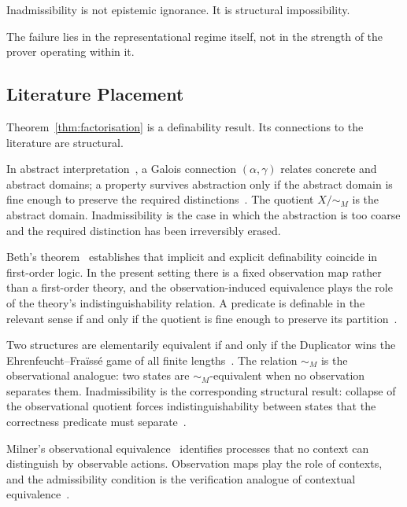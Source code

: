 \documentclass[12pt]{article}
\theoremstyle{plain}
\theoremstyle{definition}
\theoremstyle{remark}
\begin{document}
Inadmissibility is not epistemic ignorance.
It is structural impossibility.

The failure lies in the representational regime itself, not in the
strength of the prover operating within it.

\subsection{Literature Placement}
\label{subsec:literature}

Theorem~\ref{thm:factorisation} is a definability result.
Its connections to the literature are structural.

In abstract interpretation~\cite{cousot1977,cousot1979}, a Galois
connection $(\alpha,\gamma)$ relates concrete and abstract domains;
a property survives abstraction only if the abstract domain is fine
enough to preserve the required distinctions~\cite{cousot2002,giacobazzi1998}.
The quotient $X/{\sim_M}$ is the abstract domain.
Inadmissibility is the case in which the abstraction is too coarse
and the required distinction has been irreversibly erased.

Beth's theorem~\cite{beth1953} establishes that implicit and explicit
definability coincide in first-order logic.
In the present setting there is a fixed observation map rather than a
first-order theory, and the observation-induced equivalence plays the
role of the theory's indistinguishability relation.
A predicate is definable in the relevant sense if and only if the
quotient is fine enough to preserve its partition~\cite{hodges1993}.

Two structures are elementarily equivalent if and only if the
Duplicator wins the Ehrenfeucht--Fra\"{i}ss\'{e} game of all finite
lengths~\cite{ehrenfeucht1961,fraisse1954}.
The relation $\sim_M$ is the observational analogue: two states are
$\sim_M$-equivalent when no observation separates them.
Inadmissibility is the corresponding structural result: collapse of
the observational quotient forces indistinguishability between states
that the correctness predicate must separate~\cite{libkin2004}.

Milner's observational equivalence~\cite{milner1980,milner1989}
identifies processes that no context can distinguish by observable
actions.
Observation maps play the role of contexts, and the admissibility
condition is the verification analogue of contextual
equivalence~\cite{sangiorgi2011}.

\end{document}
